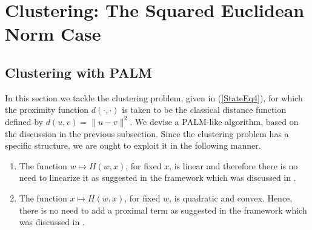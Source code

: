 \documentclass[12pt]{article}
\numberwithin{equation}{section}
\begin{document}
\section{Clustering: The Squared Euclidean Norm Case} \label{State_Clustering_SqNorm}
\subsection{Clustering with PALM}

In this section we tackle the clustering problem, given in (\ref{StateEq4}), for which the proximity function $d(\cdot,\cdot)$ is taken to be the classical distance function defined by $d(u,v) = \|u-v\|^2$. We devise a PALM-like algorithm, based on the discussion in the previous subsection.
Since the clustering problem has a specific structure, we are ought to exploit it in the following manner.
\begin{enumerate}[(1)]
	\item The function $w \mapsto H(w,x)$, for fixed $x$, is linear and therefore there is no need to linearize it as suggested in the framework which was discussed in .
	\item The function $x \mapsto H(w,x)$, for fixed $w$, is quadratic and convex. Hence, there is no need to add a proximal term as suggested in the framework which was discussed in .
\end{enumerate}
\end{document}
